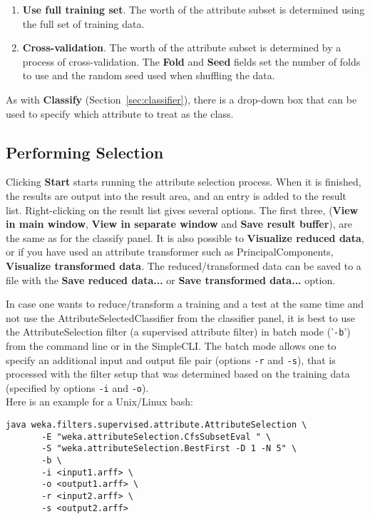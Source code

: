 \begin{enumerate}
\item \textbf{Use full training set}.
The worth of the attribute subset is determined using the full set of training
data. 
\item \textbf{Cross-validation}.
The worth of the attribute subset is determined by a process of
cross-validation.  The \textbf{Fold} and \textbf{Seed} fields set the number of
folds to use and the random seed used when shuffling the data.
\end{enumerate}
\noindent
As with \textbf{Classify} (Section~\ref{sec:classifier}), there is a drop-down
box that can be used to specify which attribute to treat as the class.

\subsection{Performing Selection}

Clicking \textbf{Start} starts running the attribute selection
process.  When it is finished, the results are output into the result
area, and an entry is added to the result list.  Right-clicking on the
result list gives several options. The first three, (\textbf{View in
main window}, \textbf{View in separate window} and \textbf{Save result
buffer}), are the same as for the classify panel.  It is also possible
to \textbf{Visualize reduced data}, or if you have used an attribute
transformer such as PrincipalComponents, \textbf{Visualize transformed
data}. The reduced/transformed data can be saved to a file with the 
\textbf{Save reduced data...} or \textbf{Save transformed data...}
option.

In case one wants to reduce/transform a training and a test at the same 
time and not use the AttributeSelectedClassifier from the classifier 
panel, it is best to use the AttributeSelection filter (a supervised 
attribute filter) in batch mode ('\texttt{-b}') 
from the command line or in the SimpleCLI. The batch mode allows one to 
specify an additional input and output file pair (options \texttt{-r} 
and \texttt{-s}), that is processed with the filter setup that 
was determined based on the training data (specified by options 
\texttt{-i} and \texttt{-o}). \\

\noindent Here is an example for a Unix/Linux bash:
\begin{verbatim}
java weka.filters.supervised.attribute.AttributeSelection \
       -E "weka.attributeSelection.CfsSubsetEval " \
       -S "weka.attributeSelection.BestFirst -D 1 -N 5" \
       -b \
       -i <input1.arff> \
       -o <output1.arff> \
       -r <input2.arff> \
       -s <output2.arff>
\end{verbatim}

